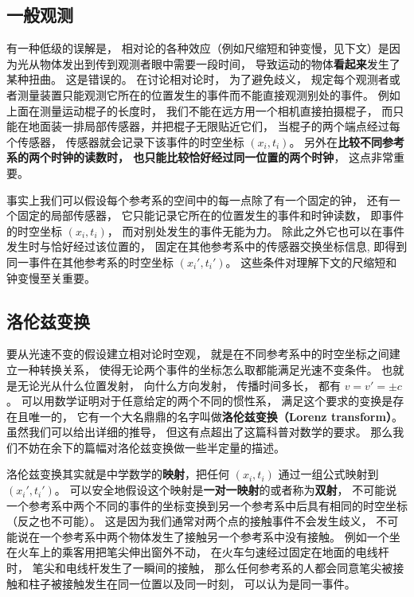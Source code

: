 \subsection{一般观测}\label{sub_Relat0_2}
有一种低级的误解是， 相对论的各种效应（例如尺缩短和钟变慢，见下文）是因为光从物体发出到传到观测者眼中需要一段时间， 导致运动的物体\textbf{看起来}发生了某种扭曲。 这是错误的。 在讨论相对论时， 为了避免歧义， 规定每个观测者或者测量装置只能观测它所在的位置发生的事件而不能直接观测别处的事件。 例如上面在测量运动棍子的长度时， 我们不能在远方用一个相机直接拍摄棍子， 而只能在地面装一排局部传感器，并把棍子无限贴近它们， 当棍子的两个端点经过每个传感器， 传感器就会记录下该事件的时空坐标 $(x_i, t_i)$。 另外在\textbf{比较不同参考系的两个时钟的读数时， 也只能比较恰好经过同一位置的两个时钟}， 这点非常重要。

事实上我们可以假设每个参考系的空间中的每一点除了有一个固定的钟， 还有一个固定的局部传感器， 它只能记录它所在的位置发生的事件和时钟读数， 即事件的时空坐标 $(x_i, t_i)$， 而对别处发生的事件无能为力。 除此之外它也可以在事件发生时与恰好经过该位置的， 固定在其他参考系中的传感器交换坐标信息, 即得到同一事件在其他参考系的时空坐标 $(x_i', t_i')$。 这些条件对理解下文的尺缩短和钟变慢至关重要。

\subsection{洛伦兹变换}
要从光速不变的假设建立相对论时空观， 就是在不同参考系中的时空坐标之间建立一种转换关系， 使得无论两个事件的坐标怎么取都能满足光速不变条件。 也就是无论光从什么位置发射， 向什么方向发射， 传播时间多长， 都有 $v = v' = \pm c$。 可以用数学证明对于任意给定的两个不同的惯性系， 满足这个要求的变换是存在且唯一的， 它有一个大名鼎鼎的名字叫做\textbf{洛伦兹变换（Lorenz transform）}。 虽然我们可以给出详细的推导， 但这有点超出了这篇科普对数学的要求。 那么我们不妨在余下的篇幅对洛伦兹变换做一些半定量的描述。

洛伦兹变换其实就是中学数学的\textbf{映射}，把任何 $(x_i, t_i)$ 通过一组公式映射到 $(x_i', t_i')$。 可以安全地假设这个映射是\textbf{一对一映射}的或者称为\textbf{双射}， 不可能说一个参考系中两个不同的事件的坐标变换到另一个参考系中后具有相同的时空坐标（反之也不可能）。 这是因为我们通常对两个点的接触事件不会发生歧义， 不可能说在一个参考系中两个物体发生了接触另一个参考系中没有接触。 例如一个坐在火车上的乘客用把笔尖伸出窗外不动， 在火车匀速经过固定在地面的电线杆时， 笔尖和电线杆发生了一瞬间的接触， 那么任何参考系的人都会同意笔尖被接触和柱子被接触发生在同一位置以及同一时刻， 可以认为是同一事件。


